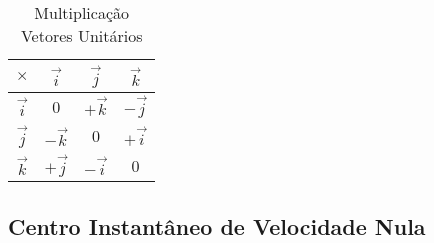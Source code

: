 \documentclass{article}
\begin{document}
                \begin{table}[H]
                    \centering
                    \begin{tabular}[]{c | c c c}
                        $\times$  & $ \vec{i}$ & $ \vec{j}$ & $ \vec{k}$\\\hline
                        $\vec{i}$ & 0          & $+\vec{k}$ & $-\vec{j}$\\
                        $\vec{j}$ & $-\vec{k}$ & 0          & $+\vec{i}$\\
                        $\vec{k}$ & $+\vec{j}$ & $-\vec{i}$ & 0\\
                    \end{tabular}
                    \caption{Multiplicação Vetores Unitários}
                \end{table}

        \subsection{Centro Instantâneo de Velocidade Nula}
\end{document}
